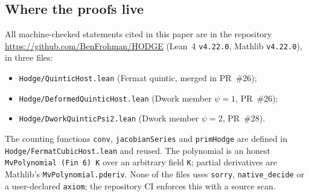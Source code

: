 \documentclass[11pt]{article}
\theoremstyle{definition}\newtheorem{definition}[theorem]{Definition}\newtheorem{remark}[theorem]{Remark}
\begin{document}
\subsection{Where the proofs live}
All machine-checked statements cited in this paper are in the repository
\url{https://github.com/BenFrohman/HODGE} (Lean~4 \texttt{v4.22.0}, Mathlib \texttt{v4.22.0}), in three files:
\begin{itemize}
\item \texttt{Hodge/QuinticHost.lean} (Fermat quintic, merged in PR~\#26);
\item \texttt{Hodge/DeformedQuinticHost.lean} (Dwork member $\psi=1$, PR~\#26);
\item \texttt{Hodge/DworkQuinticPsi2.lean} (Dwork member $\psi=2$, PR~\#28).
\end{itemize}
The counting functions \texttt{conv}, \texttt{jacobianSeries} and \texttt{primHodge} are defined in
\texttt{Hodge/FermatCubicHost.lean} and reused. The polynomial is an honest
\texttt{MvPolynomial (Fin 6) K} over an arbitrary field \texttt{K}; partial derivatives are Mathlib's
\texttt{MvPolynomial.pderiv}. None of the files uses \texttt{sorry}, \texttt{native\_decide} or a
user-declared \texttt{axiom}; the repository CI enforces this with a source scan.
\end{document}
